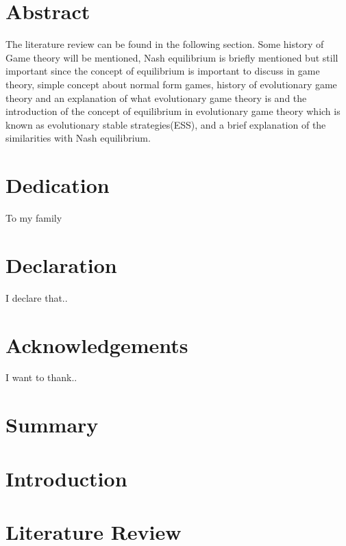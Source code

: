 \documentclass[12pt]{report}
\begin{document}
\thispagestyle{empty}



\thispagestyle{empty}
\chapter*{Abstract}
The literature review can be found in the following section. Some history of Game theory will be mentioned, Nash equilibrium is briefly mentioned but still important since the concept of equilibrium is important to discuss in game theory, simple concept about normal form games, history of evolutionary game theory and an explanation of what evolutionary game theory is and the introduction of the concept of equilibrium in evolutionary game theory which is known as evolutionary stable strategies(ESS), and a brief explanation of the similarities with Nash equilibrium.

\thispagestyle{empty}
\chapter*{Dedication}
To my family
\thispagestyle{empty}
\chapter*{Declaration}
I declare that..
\thispagestyle{empty}
\chapter*{Acknowledgements}
I want to thank..

\newpage
\thispagestyle{empty}
\tableofcontents

\newpage
\thispagestyle{empty}
\listoftables

\newpage
\thispagestyle{empty}
\listoffigures
 
\newpage
{}

\chapter*{Summary}


\chapter{Introduction}


\chapter{Literature Review}

\end{document}
